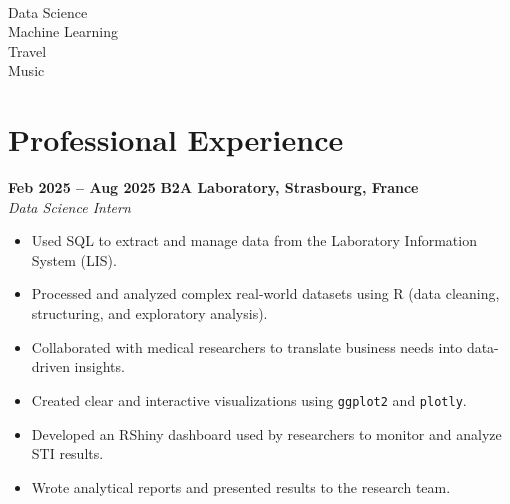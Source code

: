 \documentclass[lighthipster]{simplehipstercv}
\begin{document}
\begin{paracol}{2}
{%







\\[0.5em]
Data Science\\
Machine Learning\\
Travel\\
Music\\


\vspace{4em}


\phantom{turn the page}

\phantom{turn the page}
}
\switchcolumn

\small
\section*{Professional Experience}

\textbf{Feb 2025 -- Aug 2025} \hfill \textbf{B2A Laboratory, Strasbourg, France}\\
\textit{Data Science Intern}
\begin{itemize}[leftmargin=2em, itemsep=0.2em, topsep=0em]
    \item Used SQL to extract and manage data from the Laboratory Information System (LIS).
    \item Processed and analyzed complex real-world datasets using R (data cleaning, structuring, and exploratory analysis).
    \item Collaborated with medical researchers to translate business needs into data-driven insights.
    \item Created clear and interactive visualizations using \texttt{ggplot2} and \texttt{plotly}.
    \item Developed an RShiny dashboard used by researchers to monitor and analyze STI results.
    \item Wrote analytical reports and presented results to the research team.
\end{itemize}


\end{paracol}
\end{document}
